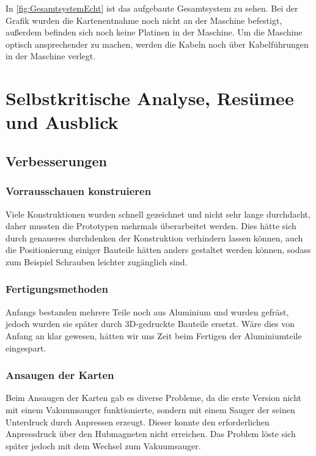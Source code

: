 In \autoref{fig:GesamtsystemEcht} ist das aufgebaute Gesamtsystem zu sehen.
Bei der Grafik wurden die Kartenentnahme noch nicht an der Maschine befestigt, außerdem befinden
sich noch keine Platinen in der Maschine. Um die Maschine optisch ansprechender zu machen,
werden die Kabeln noch über Kabelführungen in der Maschine verlegt.

\section{Selbstkritische Analyse, Resümee und Ausblick}
\subsection{Verbesserungen}

\subsubsection{Vorrausschauen konstruieren}
Viele Konstruktionen wurden schnell gezeichnet und nicht sehr lange durchdacht, daher mussten die Prototypen mehrmals überarbeitet werden.
Dies hätte sich durch genaueres durchdenken der Konstruktion verhindern lassen können, auch die Positionierung
einiger Bauteile hätten anders gestaltet werden können, sodass zum Beispiel Schrauben leichter zugänglich sind.

\subsubsection{Fertigungsmethoden}
Anfangs bestanden mehrere Teile noch aus Aluminium und wurden gefräst, jedoch wurden sie später durch 3D-gedruckte
Bauteile ersetzt. Wäre dies von Anfang an klar gewesen, hätten wir uns Zeit beim Fertigen der Aluminiumteile eingespart.
\subsubsection{Ansaugen der Karten}
Beim Ansaugen der Karten gab es diverse Probleme, da die erste Version nicht mit einem Vakuumsauger funktionierte, sondern
mit einem Sauger der seinen Unterdruck durch Anpressen erzeugt. Dieser konnte den erforderlichen Anpressdruck über
den Hubmagneten nicht erreichen. Das Problem löste sich später jedoch mit dem Wechsel zum Vakuumsauger.

